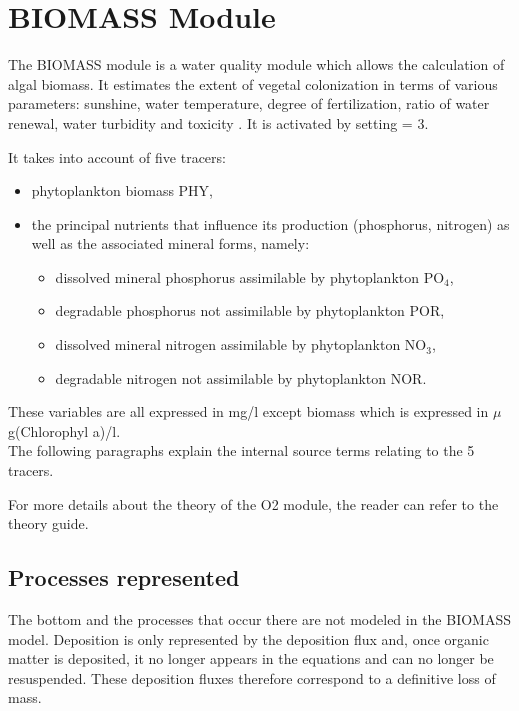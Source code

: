 \chapter{BIOMASS Module}

The BIOMASS module is a water quality module which allows the calculation of algal biomass.
It estimates the extent of vegetal colonization in terms of various parameters:
sunshine, water temperature, degree of fertilization, ratio of water renewal,
water turbidity and toxicity \cite{gosse_biomass_1983}.
It is activated by setting  = 3.

It takes into account of five tracers:

\begin{itemize}
\item phytoplankton biomass PHY,
\item the principal nutrients that influence its production (phosphorus, nitrogen)
  as well as the associated mineral forms, namely:

\begin{itemize}
\item dissolved mineral phosphorus assimilable by phytoplankton PO$_4$,
\item degradable phosphorus not assimilable by phytoplankton POR,
\item dissolved mineral nitrogen assimilable by phytoplankton NO$_3$,
\item degradable nitrogen not assimilable by phytoplankton NOR.
\end{itemize}
\end{itemize}

These variables are all expressed in mg/l except biomass which is expressed in $\mu$g(Chlorophyl a)/l.\\

The following paragraphs explain the internal source terms relating to the 5 tracers.

For more details about the theory of the O2 module,
the reader can refer to the \waqtel theory guide.


\section{Processes represented}

The bottom and the processes that occur there are not modeled in the BIOMASS model.
Deposition is only represented by the deposition flux and,
once organic matter is deposited,
it no longer appears in the equations and can no longer be resuspended.
These deposition fluxes therefore correspond to a definitive loss of mass.


